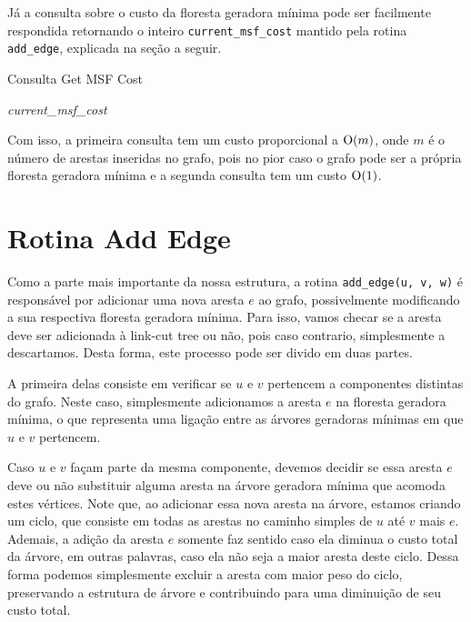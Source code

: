 Já a consulta sobre o custo da floresta geradora mínima pode ser facilmente respondida retornando o inteiro \texttt{current\_msf\_cost} mantido pela rotina \texttt{add\_edge}, explicada na seção a seguir.

\begin{algorithm}[h!]
    \caption{Consulta Get MSF Cost}\label{imsf-get-msf-cost}
    \begin{algorithmic}
        \State \Return \emph{current\_msf\_cost}
        \EndFunction
    \end{algorithmic}
\end{algorithm}

Com isso, a primeira consulta tem um custo proporcional a $\mathrm{O}(m)$, onde $m$ é o número de arestas inseridas no grafo, pois no pior caso o grafo pode ser a própria floresta geradora mínima e a segunda consulta tem um custo $\mathrm{O}(1)$.

\section{Rotina Add Edge}
\label{sec:imsf-add-edge}

Como a parte mais importante da nossa estrutura, a rotina \texttt{add\_edge(u, v, w)} é responsável por adicionar uma nova aresta $e$ ao grafo, possivelmente modificando a sua respectiva floresta geradora mínima. Para isso, vamos checar se a aresta deve ser adicionada à link-cut tree ou não, pois caso contrario, simplesmente a descartamos. Desta forma, este processo pode ser divido em duas partes.

A primeira delas consiste em verificar se $u$ e $v$ pertencem a componentes distintas do grafo. Neste caso, simplesmente adicionamos a aresta $e$ na floresta geradora mínima, o que representa uma ligação entre as árvores geradoras mínimas em que $u$ e $v$ pertencem.

Caso $u$ e $v$ façam parte da mesma componente, devemos decidir se essa aresta $e$ deve ou não substituir alguma aresta na árvore geradora mínima que acomoda estes vértices. Note que, ao adicionar essa nova aresta na árvore, estamos criando um ciclo, que consiste em todas as arestas no caminho simples de $u$ até $v$ mais $e$. Ademais, a adição da aresta $e$ somente faz sentido caso ela diminua o custo total da árvore, em outras palavras, caso ela não seja a maior aresta deste ciclo. Dessa forma podemos simplesmente excluir a aresta com maior peso do ciclo, preservando a estrutura de árvore e contribuindo para uma diminuição de seu custo total.

